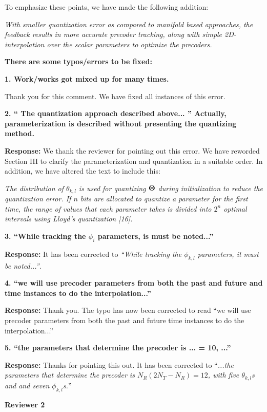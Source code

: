 \documentclass[12pt]{letter}
\begin{document}
To emphasize these points, we have made the following addition:

\emph{With smaller
quantization error as compared to manifold based approaches, the
feedback results in more accurate precoder tracking, along with simple
2D-interpolation over the scalar parameters to optimize the precoders.}

\textbf{There are some typos/errors to be fixed:}

\textbf{1. Work/works got mixed up for many times.}

Thank you for this comment. We have fixed all instances of this error.

\textbf{2. `` The quantization approach described above... '' Actually,
  parameterization is described without presenting the quantizing
  method.}

\textbf{Response:} We thank the reviewer for pointing out this
error. We have reworded Section III to clarify the parameterization and quantization
in a suitable order. In addition, we have altered the text to include this:

\emph{The distribution of $\theta_{k,l}$ is used for
quantizing $\bf{\Theta}$ during initialization to reduce the
quantization error.  If $n$ bits are allocated to quantize a
parameter for the first time, the range of values that each parameter
takes is divided into $2^n$ optimal intervals using Lloyd's
quantization [16].}

\textbf{3. ``While tracking the $\phi_i$ parameters, is must be noted...''}

\textbf{Response:} It has been corrected to \emph{``While tracking the $\phi_{k,l}$ parameters, it must be noted...''}.

\textbf{4. ``we will use precoder parameters from both the past and future and
time instances to do the interpolation...''}

\textbf{Response:} Thank you. The typo has now been corrected to read
``we will use precoder parameters from both the past and future time instances to do the interpolation...''

\textbf{5. ``the parameters that determine the precoder is ...  = 10, ...''}

\textbf{Response:} Thanks for pointing this out. It has been corrected to ``\emph{...the parameters that determine the precoder is
$N_{R}(2N_{T} - N_R) = 12$, with five $\theta_{k,l}$s and and seven
$\phi_{k,l}$s.}''

\textbf{Reviewer 2}\\
\end{document}
